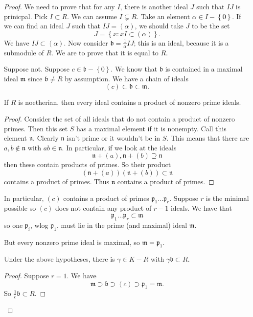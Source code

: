 \begin{proof} 
We need to prove that for any $I$, there is another ideal $J$ such that $IJ $
is prinicpal.  Pick $I \subset R$.  We can assume $I \subsetneq R$.  Take an
element $\alpha \in I - \left\{0\right\}$.  If we can find an ideal $J$ such
that $IJ = (\alpha)$, we should take $J$ to be the set
\[ J = \left\{x: xI \subset (\alpha) \right\}.  \]
We have $IJ \subset (\alpha)$.
Now consider $\mathfrak{b}=\frac{1}{\alpha} IJ$; this is an ideal, because it is a submodule
of $R$.  We are to prove that it is equal to $R$.

Suppose not. Suppose $c \in \mathfrak{b} - \left\{0\right\}$.  We know that
$\mathfrak{b}$ is contained in a maximal ideal $\mathfrak{m}$ since
$\mathfrak{b} \neq R$ by assumption. We have a chain of ideals
\[ (c) \subset \mathfrak{b} \subset \mathfrak{m}.  \]

\begin{lemma} 
If $R$ is noetherian, then every ideal contains a product of nonzero prime
ideals.
\end{lemma} 
\begin{proof} 
Consider the set of all ideals that do not contain a product of nonzero
primes.  Then this set $S$ has a maximal element if it is nonempty.  Call this
element $\mathfrak{n}$.  Clearly $\mathfrak{n}$ isn't prime or it wouldn't be
in $S$.  
This means that there are $a,b \notin \mathfrak{n}$ with $ab \in
\mathfrak{n}$.  In particular, if we look at the ideals
\[ \mathfrak{n} + (a), \mathfrak{n} + (b) \supsetneq \mathfrak{n}  \]
then these contain products of primes. So their product
\[ (\mathfrak{n} + (a))(\mathfrak{n}+(b)) \subset \mathfrak{n}  \]
contains a product of primes. Thus $\mathfrak{n}$ contains a product of primes.  
\end{proof} 


In particular, $(c)$ contains a product of primes $\mathfrak{p}_1 \dots
\mathfrak{p}_r$. Suppose $r$ is the minimal possible so $(c)$ does not contain
any product of $r-1$ ideals.  
We have that 
\[ \mathfrak{p}_1 \dots \mathfrak{p}_r \subset \mathfrak{m}  \]
so one $\mathfrak{p}_i$, wlog $\mathfrak{p}_1$, must lie in the prime (and
maximal) ideal $\mathfrak{m}$.  

But every nonzero prime ideal is maximal, so $\mathfrak{m} = \mathfrak{p}_1$.  

\begin{lemma} 
Under the above hypotheses, there is $\gamma \in K - R$ with $\gamma
\mathfrak{b} \subset R$.
\end{lemma} 
\begin{proof} 
Suppose $r=1$. We have
\[ \mathfrak{m} \supset \mathfrak{b} \supset (c) \supset \mathfrak{p}_1 =
\mathfrak{m}. \]
So $\frac{1}{c}\mathfrak{b} \subset R$.  


\end{proof}
\end{proof}
